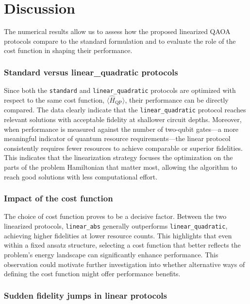 \chapter{Discussion}
\label{Chapter:Discussion}

The numerical results allow us to assess how the proposed linearized QAOA protocols compare to the standard formulation and to evaluate the role of the cost function in shaping their performance.

\subsection*{Standard versus linear\_quadratic protocols}

Since both the \texttt{standard} and \texttt{linear\_quadratic} protocols are optimized with respect to the same cost function, $\langle \hat{H}_\mathrm{QP} \rangle$, their performance can be directly compared. The data clearly indicate that the \texttt{linear\_quadratic} protocol reaches relevant solutions with acceptable fidelity at shallower circuit depths. Moreover, when performance is measured against the number of two-qubit gates—a more meaningful indicator of quantum resource requirements—the linear protocol consistently requires fewer resources to achieve comparable or superior fidelities. This indicates that the linearization strategy focuses the optimization on the parts of the problem Hamiltonian that matter most, allowing the algorithm to reach good solutions with less computational effort.

\subsection*{Impact of the cost function}

The choice of cost function proves to be a decisive factor. Between the two linearized protocols, \texttt{linear\_abs} generally outperforms \texttt{linear\_quadratic}, achieving higher fidelities at lower resource counts. This highlights that even within a fixed ansatz structure, selecting a cost function that better reflects the problem's energy landscape can significantly enhance performance. This observation could motivate further investigation into whether alternative ways of defining the cost function might offer performance benefits.

\subsection*{Sudden fidelity jumps in linear protocols}

